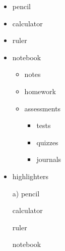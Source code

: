 \documentclass[11pt]{article}
\begin{document}
\vspace{1cm}

\begin{itemize}
\item pencil
\item calculator
\item ruler
\item notebook
	
	\begin{itemize}
	\item notes
	\item homework
	\item assessments
		
		\begin{itemize}
		\item tests
		\item quizzes
		\item journals
		\end{itemize}			
	\end{itemize}
\item highlighters
\end{itemize}

\vspace{1cm}

\begin{enumerate}
\item[a)] pencil
\item[] calculator
\item[] ruler
\item[] notebook
\end{enumerate}
\end{document}
